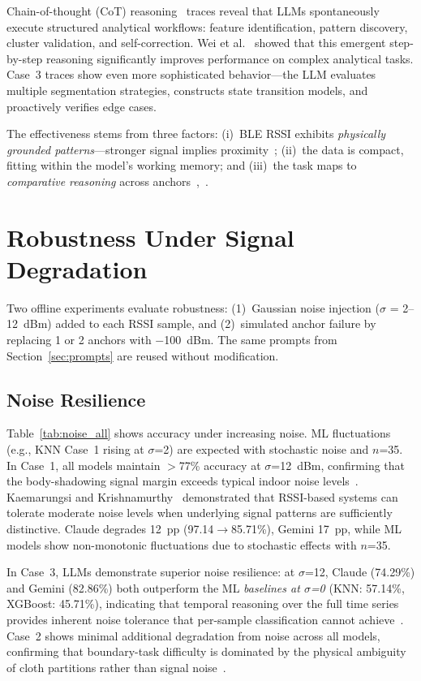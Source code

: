 \documentclass[conference]{IEEEtran}
\begin{document}
Chain-of-thought (CoT) reasoning~\cite{b18} traces reveal that LLMs spontaneously execute structured analytical workflows: feature identification, pattern discovery, cluster validation, and self-correction. Wei et al.~\cite{b18} showed that this emergent step-by-step reasoning significantly improves performance on complex analytical tasks. Case~3 traces show even more sophisticated behavior---the LLM evaluates multiple segmentation strategies, constructs state transition models, and proactively verifies edge cases.

The effectiveness stems from three factors: (i)~BLE RSSI exhibits \textit{physically grounded patterns}---stronger signal implies proximity~\cite{b6}; (ii)~the data is compact, fitting within the model's working memory; and (iii)~the task maps to \textit{comparative reasoning} across anchors~\cite{b7},~\cite{b8}.



\section{Robustness Under Signal Degradation}
\label{sec:robust}
Two offline experiments evaluate robustness: (1)~Gaussian noise injection ($\sigma$ = 2--12~dBm) added to each RSSI sample, and (2)~simulated anchor failure by replacing 1 or 2 anchors with $-$100~dBm. The same prompts from Section~\ref{sec:prompts} are reused without modification.

\subsection{Noise Resilience}
Table~\ref{tab:noise_all} shows accuracy under increasing noise. ML fluctuations (e.g., KNN Case~1 rising at $\sigma$=2) are expected with stochastic noise and $n$=35. In Case~1, all models maintain $>$77\% accuracy at $\sigma$=12~dBm, confirming that the body-shadowing signal margin exceeds typical indoor noise levels~\cite{b14}. Kaemarungsi and Krishnamurthy~\cite{b14} demonstrated that RSSI-based systems can tolerate moderate noise levels when underlying signal patterns are sufficiently distinctive. Claude degrades 12~pp (97.14$\to$85.71\%), Gemini 17~pp, while ML models show non-monotonic fluctuations due to stochastic effects with $n$=35.

In Case~3, LLMs demonstrate superior noise resilience: at $\sigma$=12, Claude (74.29\%) and Gemini (82.86\%) both outperform the ML \textit{baselines at $\sigma$=0} (KNN: 57.14\%, XGBoost: 45.71\%), indicating that temporal reasoning over the full time series provides inherent noise tolerance that per-sample classification cannot achieve~\cite{b17}. Case~2 shows minimal additional degradation from noise across all models, confirming that boundary-task difficulty is dominated by the physical ambiguity of cloth partitions rather than signal noise~\cite{b5}.
\end{document}
